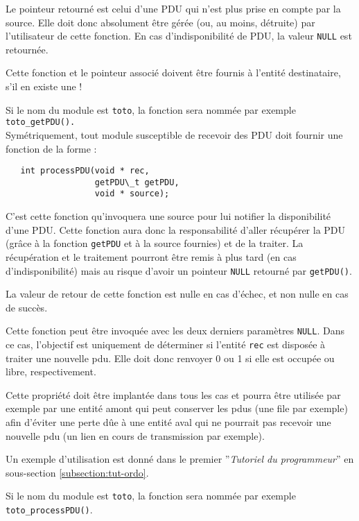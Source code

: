 \documentclass{article}
\begin{document}
   Le pointeur retourné est celui d'une PDU qui n'est plus prise en
compte par la source. Elle doit donc absolument être gérée (ou, au
moins, détruite) par l'utilisateur de cette fonction. En cas
d'indisponibilité de PDU, la valeur {\tt NULL} est retournée.

   Cette fonction et le pointeur associé doivent être fournis à
l'entité destinataire, s'il en existe une !

   Si le nom du module est {\tt toto}, la fonction sera nommée par exemple
{\tt toto\_getPDU().}\\

   Symétriquement, tout module susceptible de recevoir des PDU doit fournir une
fonction de la forme :


\begin{verbatim}
   int processPDU(void * rec,
                  getPDU\_t getPDU,
                  void * source);
\end{verbatim}

   C'est cette fonction qu'invoquera une source pour lui notifier la
disponibilité d'une PDU. Cette fonction aura donc la responsabilité
d'aller récupérer la PDU (grâce à la fonction \lstinline!getPDU! et à la source
fournies) et de la traiter. La récupération et le traitement pourront
être remis à plus tard (en cas d'indisponibilité) mais au risque
d'avoir un pointeur \lstinline!NULL! retourné par
\lstinline!getPDU()!.

   La valeur de retour de cette fonction est nulle en cas d'échec, et
non nulle en cas de succès.

   Cette fonction peut être invoquée avec les deux derniers paramètres
{\tt NULL}. Dans ce cas, l'objectif est uniquement de déterminer si
l'entité {\tt rec} est disposée à traiter une nouvelle {\sc pdu}. Elle
doit donc renvoyer 0 ou 1 si elle est occupée ou libre,
respectivement. 

   Cette propriété doit être implantée dans tous les cas et pourra
être utilisée par exemple par une entité amont qui peut conserver les
{\sc pdu}s (une file par exemple) afin d'éviter une perte dûe à une
entité aval qui ne pourrait pas recevoir une nouvelle {\sc pdu} (un
lien en cours de  transmission par exemple).

   Un exemple d'utilisation est donné dans le premier ''{\em Tutoriel
     du programmeur}'' en sous-section \ref{subsection:tut-ordo}.

   Si le nom du module est {\tt toto}, la fonction sera nommée par exemple
{\tt toto\_processPDU()}.
\end{document}
